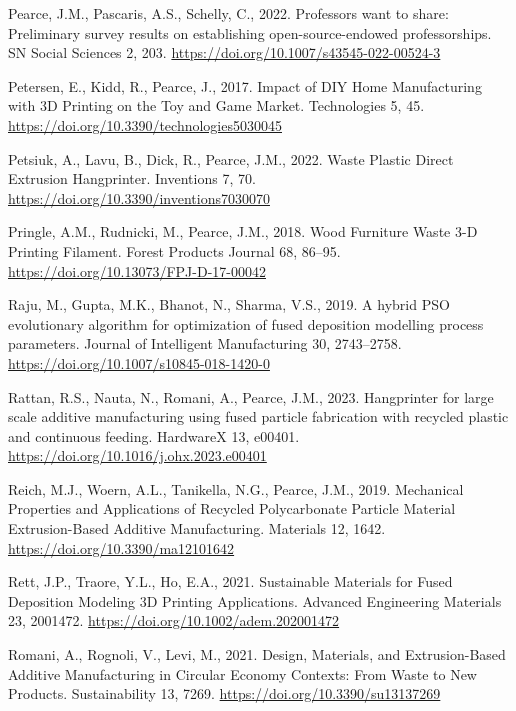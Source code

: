 \documentclass[
  12pt,
  number,
  review]{elsarticle}
\newlength{\cslhangindent}
\newlength{\cslentryspacingunit} %
\newenvironment{CSLReferences}[2] %
 {%
  \setlength{\parindent}{0pt}
  \ifodd #1
  \let\oldpar\par
  \def\par{\hangindent=\cslhangindent\oldpar}
  \fi
  \setlength{\parskip}{#2\cslentryspacingunit}
 }%
 {}
\begin{document}
\begin{CSLReferences}{1}{0}
\leavevmode{}%
Pearce, J.M., Pascaris, A.S., Schelly, C., 2022. Professors want to
share: Preliminary survey results on establishing open-source-endowed
professorships. SN Social Sciences 2, 203.
\url{https://doi.org/10.1007/s43545-022-00524-3}

\leavevmode{}%
Petersen, E., Kidd, R., Pearce, J., 2017. Impact of {DIY Home
Manufacturing} with {3D Printing} on the {Toy} and {Game Market}.
Technologies 5, 45. \url{https://doi.org/10.3390/technologies5030045}

\leavevmode{}%
Petsiuk, A., Lavu, B., Dick, R., Pearce, J.M., 2022. Waste {Plastic
Direct Extrusion Hangprinter}. Inventions 7, 70.
\url{https://doi.org/10.3390/inventions7030070}

\leavevmode{}%
Pringle, A.M., Rudnicki, M., Pearce, J.M., 2018. Wood {Furniture
Waste} 3-{D Printing Filament}. Forest
Products Journal 68, 86--95.
\url{https://doi.org/10.13073/FPJ-D-17-00042}

\leavevmode{}%
Raju, M., Gupta, M.K., Bhanot, N., Sharma, V.S., 2019. A hybrid
{PSO} evolutionary algorithm for optimization of fused
deposition modelling process parameters. Journal of Intelligent
Manufacturing 30, 2743--2758.
\url{https://doi.org/10.1007/s10845-018-1420-0}

\leavevmode{}%
Rattan, R.S., Nauta, N., Romani, A., Pearce, J.M., 2023. Hangprinter for
large scale additive manufacturing using fused particle fabrication with
recycled plastic and continuous feeding. HardwareX 13, e00401.
\url{https://doi.org/10.1016/j.ohx.2023.e00401}

\leavevmode{}%
Reich, M.J., Woern, A.L., Tanikella, N.G., Pearce, J.M., 2019.
Mechanical {Properties} and {Applications} of {Recycled Polycarbonate
Particle Material Extrusion-Based Additive Manufacturing}. Materials 12,
1642. \url{https://doi.org/10.3390/ma12101642}

\leavevmode{}%
Rett, J.P., Traore, Y.L., Ho, E.A., 2021. Sustainable {Materials} for
{Fused Deposition Modeling 3D Printing Applications}. Advanced
Engineering Materials 23, 2001472.
\url{https://doi.org/10.1002/adem.202001472}

\leavevmode{}%
Romani, A., Rognoli, V., Levi, M., 2021. Design, {Materials}, and
{Extrusion-Based Additive Manufacturing} in {Circular Economy Contexts}:
{From Waste} to {New Products}. Sustainability 13, 7269.
\url{https://doi.org/10.3390/su13137269}


\end{CSLReferences}
\end{document}
